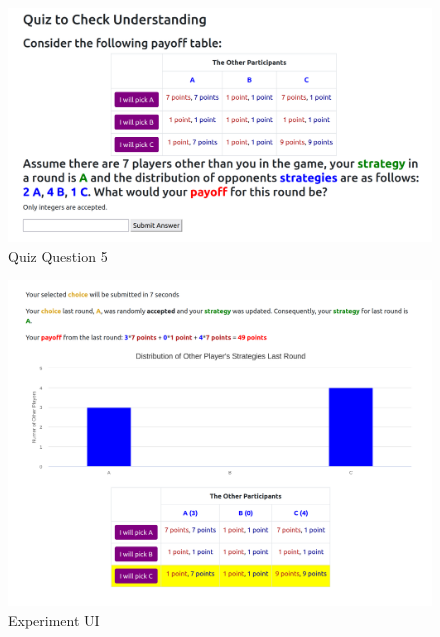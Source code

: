 \begin{figure}[h]
\captionsetup{justification=centering}
  \caption[caption]{Quiz Question 5}
   \label{fig:QuizQ5}
    \includegraphics[width = \textwidth]{Images/Q5.png}    
\end{figure}

\begin{figure}[h]
\captionsetup{justification=centering}
  \caption[caption]{Experiment UI}
   \label{fig:UI1}
    \includegraphics[width = \textwidth]{Images/Game1Choice.png}
\end{figure}

